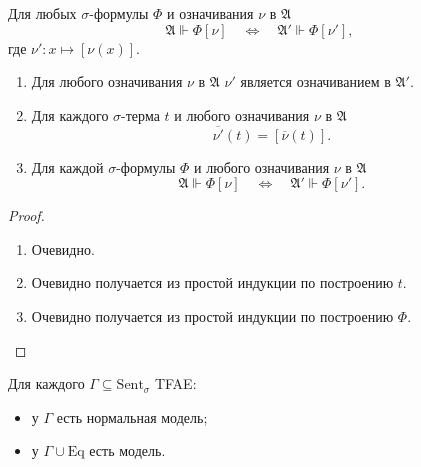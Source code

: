 \documentclass[12pt,a4paper]{article}
\newcommand{\Sent}{\ensuremath{\mathrm{Sent}}\xspace}
\newcommand{\Eq}{\ensuremath{\mathrm{Eq}}\xspace}
\begin{document}
    \begin{theorem}
        Для любых $\sigma$-формулы $\Phi$ и означивания $\nu$ в $\mathfrak{A}$
        \[
            \mathfrak{A} \Vdash \Phi[\nu]
            \quad \Longleftrightarrow \quad
            \mathfrak{A}' \Vdash \Phi[\nu'],
        \]
        где $\nu': x \mapsto [\nu(x)]$.
    \end{theorem}

    \begin{theorem}%
        \begin{enumerate}\ 
            \item Для любого означивания $\nu$ в $\mathfrak{A}$ $\nu'$ является означиванием в $\mathfrak{A}'$.
            \item Для каждого $\sigma$-терма $t$ и любого означивания $\nu$ в $\mathfrak{A}$
                \[\overline{\nu'}(t) = [\overline{\nu}(t)].\]
            \item Для каждой $\sigma$-формулы $\Phi$ и любого означивания $\nu$ в $\mathfrak{A}$
                \[
                    \mathfrak{A} \Vdash \Phi[\nu]
                    \quad \Longleftrightarrow \quad
                    \mathfrak{A}' \Vdash \Phi[\nu'].
                \]
        \end{enumerate}
    \end{theorem}

    \begin{proof}
        \begin{enumerate}
            \item Очевидно.
            \item Очевидно получается из простой индукции по построению $t$.
            \item Очевидно получается из простой индукции по построению $\Phi$.
        \end{enumerate}
    \end{proof}

    \begin{corollary}
        Для каждого $\Gamma \subseteq \Sent_\sigma$ TFAE:
        \begin{itemize}
            \item у $\Gamma$ есть нормальная модель;
            \item у $\Gamma \cup \Eq$ есть модель.
        \end{itemize}
    \end{corollary}
\end{document}
